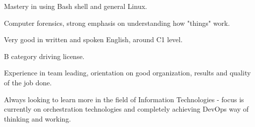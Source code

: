 \documentclass{cv}
\begin{document}
Mastery in using Bash shell and general Linux.

Computer forensics, strong emphasis on understanding how "things" work.

Very good in written and spoken English, around C1 level.

B category driving license.

Experience in team leading, orientation on good organization, results and quality of the job done.

Always looking to learn more in the field of Information Technologies - focus is currently on orchestration technologies and completely achieving DevOps way of thinking and working.
\end{document}
